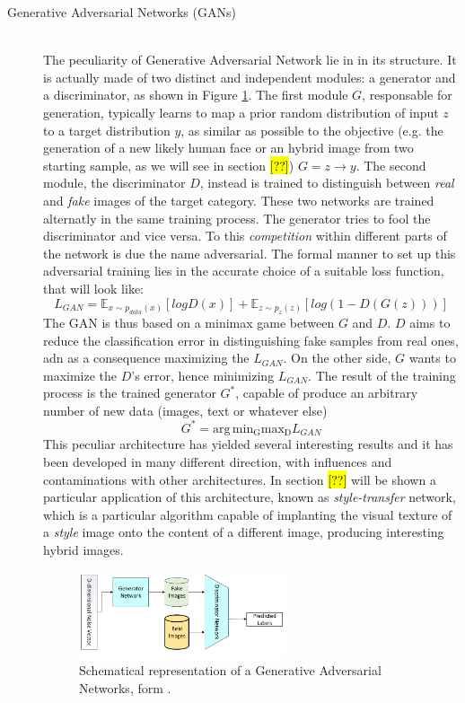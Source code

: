 \begin{description}
    \item [Generative Adversarial Networks (GANs)] \hfill \\
        The peculiarity of Generative Adversarial Network lie in in its structure. It is actually made of two distinct and independent modules: a generator and a discriminator, as shown in Figure \ref{fig:GAN}. The first module $G$, responsable for generation, typically learns to map a prior random distribution of input $z$ to a target distribution $y$, as similar as possible to the objective (e.g. the generation of a new likely human face or an hybrid image from two starting sample, as we will see in section \hl{[??]}) $G = z \rightarrow y$. The second module, the discriminator $D$, instead is trained to distinguish between \textit{real} and \textit{fake} images of the target category. These two networks are trained alternatly in the same training process. The generator tries to fool the discriminator and vice versa. To this \textit{competition} within different parts of the network is due the name adversarial. The formal manner to set up this adversarial training lies in the accurate choice of a suitable loss function, that will look like: $$L_{GAN} = \mathbb{E}_{x \sim p_{data}(x)}[logD(x)] + \mathbb{E}_{z \sim p_{z}(z)}[log(1-D(G(z)))]$$
        The GAN is thus based on a minimax game between $G$ and $D$. $D$ aims to reduce the classification error in distinguishing fake samples from real ones, adn as a consequence maximizing the $L_{GAN}$. On the other side, $G$ wants to maximize the $D$'s error, hence minimizing $L_{GAN}$. The result of the training process is the trained generator $G^*$, capable of produce an arbitrary number of new data (images, text or whatever else) $$ G^* = \operatorname*{arg\,min_Gmax_D} L_{GAN}$$
        This peculiar architecture has yielded several interesting results and it has been developed in many different direction, with influences and contaminations with other architectures. In section \hl{[??]} will be shown a particular application of this architecture, known as \textit{style-transfer} network, which is a particular algorithm capable of implanting the visual texture of a \textit{style} image onto the content of a different image, producing interesting hybrid images.


        \begin{figure}
            \centering
            \includegraphics[width = 0.6\textwidth]{images/GAN}
            \caption{Schematical representation of a Generative Adversarial Networks, form \cite{deep_seg_SOA}.}
            \label{fig:GAN}
        \end{figure}



\end{description}
